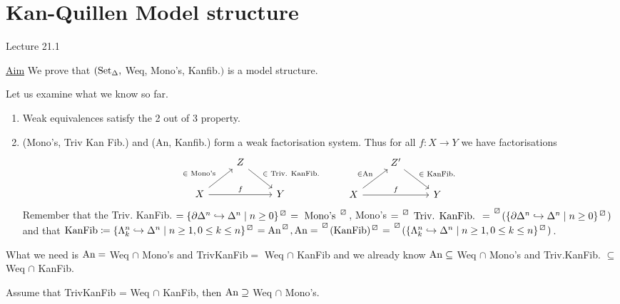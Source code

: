 \section{Kan-Quillen Model structure}

Lecture 21.1

\underline{Aim} We prove that $(\operatorname{Set}_{\Delta},$ Weq, Mono's, Kanfib.$)$ is a model structure.

Let us examine what we know so far.
\begin{enumerate}
    \item 
    Weak equivalences satisfy the 2 out of 3 property.
    \item 
    (Mono's, Triv Kan Fib.) and (An, Kanfib.) form a weak factorisation system.
    Thus for all $f\colon X \to Y$ we have factorisations
    \[
    \begin{tikzcd}
        &
        Z
        \ar[rd, "\in \text{ Triv. KanFib. }"]
        &
        \\
        X
        \ar[ru, " \in \text{ Mono's }"]
        \ar[rr, "f"]
        &&
        Y
    \end{tikzcd}
    \qquad
    \begin{tikzcd}
        &
        Z'
        \ar[rd, "\in \text{ KanFib. }"]
        &
        \\
        X
        \ar[ru, " \in \An "]
        \ar[rr, "f"]
        &&
        Y
    \end{tikzcd}
    \]
    Remember that the Triv. KanFib. $= \{ \partial\Delta^n \hookrightarrow \Delta^n \mid n \geq 0 \}^{\lift{}}=\text{ Mono's }^{\lift{}}$, Mono's $=\prescript{\lift{}}{}{\text{ Triv. KanFib. }} = \prescript{\lift{}}{}{(\{ \partial\Delta^n \hookrightarrow \Delta^n \mid n \geq 0 \}^{\lift{}})}$ and that $\KanFib\coloneqq \{ \Lambda_k^n \hookrightarrow \Delta^n \mid n \geq 1, 0 \leq k \leq n \}^{\lift{}}= \An^{\lift{}}, \An= \prescript{\lift{}}{}{(\KanFib)^{\lift{}}}= \prescript{\lift{}}{}{(\{ \Lambda_k^n \hookrightarrow \Delta^n \mid n \geq 1, 0 \leq k \leq n\}^{\lift{}})}$.
\end{enumerate}

What we need is $\operatorname{An}=$ Weq $\cap$ Mono's and TrivKanFib$=$ Weq $\cap$ KanFib and we already know $\operatorname{An} \subseteq$ Weq $\cap$ Mono's and Triv.KanFib. $\subseteq$ Weq $\cap$ KanFib.

\begin{prop}
    Assume that TrivKanFib = Weq $\cap$ KanFib, then $\operatorname{An} \supseteq$ Weq $\cap$ Mono's.
\end{prop}

